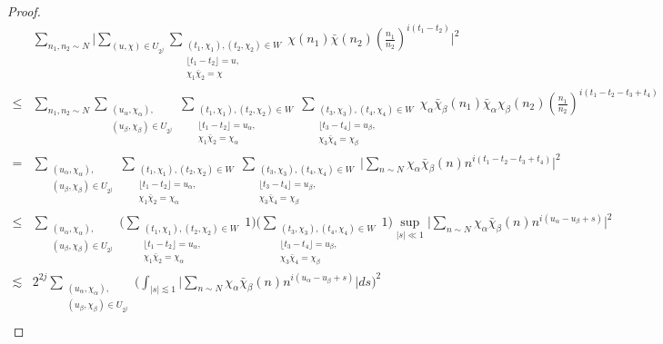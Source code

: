 \begin{proof}
\begin{align*}
    &\sum_{n_1,n_2\sim N} \Bigg|
   \sum_{(u,\chi)\in U_{2^j}}\sum_{\substack{(t_1,\chi_1),(t_2,\chi_2)\in W\\ \lfloor t_1-t_2 \rfloor = u,\\ \chi_1\bar\chi_2=\chi}} 
  \chi(n_1)\bar{\chi}(n_2) \left(\frac{n_1}{n_2}\right)^{i(t_1-t_2)}\Bigg|^2\\
  \leq &\sum_{n_1,n_2\sim N} 
  \sum_{\substack{(u_{\alpha},\chi_{\alpha}),\\(u_{\beta},\chi_{\beta})\in U_{2^j}}}\sum_{\substack{(t_1,\chi_1),(t_2,\chi_2)\in W\\ \lfloor t_1-t_2 \rfloor = u_{\alpha},\\ \chi_1\bar\chi_2=\chi_{\alpha}}} \sum_{\substack{(t_3,\chi_3),(t_4,\chi_4)\in W\\ \lfloor t_3-t_4 \rfloor = u_{\beta},\\ \chi_3\bar\chi_4=\chi_{\beta}}} 
 \chi_\alpha\bar\chi_\beta(n_1)\bar{\chi}_\alpha\chi_\beta(n_2) \left(\frac{n_1}{n_2}\right)^{i(t_1-t_2-t_3+t_4)}\\
 =&\sum_{\substack{(u_{\alpha},\chi_{\alpha}),\\(u_{\beta},\chi_{\beta})\in U_{2^j}}}\sum_{\substack{(t_1,\chi_1),(t_2,\chi_2)\in W\\ \lfloor t_1-t_2 \rfloor = u_{\alpha},\\ \chi_1\bar\chi_2=\chi_{\alpha}}} \sum_{\substack{(t_3,\chi_3),(t_4,\chi_4)\in W\\ \lfloor t_3-t_4 \rfloor = u_{\beta},\\ \chi_3\bar\chi_4=\chi_{\beta}}}\Big| \sum_{n\sim N}  \chi_\alpha\bar\chi_\beta(n){n}^{i(t_1-t_2-t_3+t_4)}\Big|^2\\
 \leq & \sum_{\substack{(u_{\alpha},\chi_{\alpha}),\\(u_{\beta},\chi_{\beta})\in U_{2^j}}}
 \Bigg(\sum_{\substack{(t_1,\chi_1),(t_2,\chi_2)\in W\\ \lfloor t_1-t_2 \rfloor = u_{\alpha},\\ \chi_1\bar\chi_2=\chi_{\alpha}}} 1\Bigg)
 \Bigg(\sum_{\substack{(t_3,\chi_3),(t_4,\chi_4)\in W\\ \lfloor t_3-t_4 \rfloor = u_{\beta},\\ \chi_3\bar\chi_4=\chi_{\beta}}} 1\Bigg)
 \sup_{|s|\ll 1}\Big| \sum_{n\sim N}  \chi_\alpha\bar\chi_\beta(n){n}^{i(u_\alpha - u_\beta + s)}\Big|^2\\
 \lesssim & 2^{2j} \sum_{\substack{(u_{\alpha},\chi_{\alpha}),\\(u_{\beta},\chi_{\beta})\in U_{2^j}}} \Bigg(\int_{|s|\lesssim 1}\Big|\sum_{n\sim N}  \chi_\alpha\bar\chi_\beta(n){n}^{i(u_\alpha - u_\beta + s)}\Big|ds \Bigg)^2\\

\end{align*}
\end{proof}
